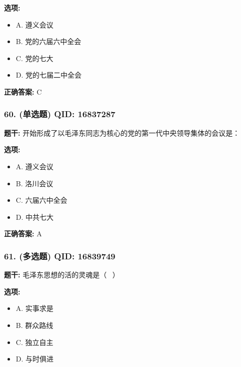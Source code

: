 \documentclass[12pt,UTF8]{ctexart}
\begin{document}
\textbf{选项:}
\begin{itemize}[leftmargin=*]

  \item A. 遵义会议

  \item B. 党的六届六中全会

  \item C. 党的七大

  \item D. 党的七届二中全会

\end{itemize}

\textbf{正确答案:}
C

\vspace{0.3em}\hrulefill\vspace{0.7em}

\subsubsection*{60. (单选题) \small QID: 16837287}

\textbf{题干:}
开始形成了以毛泽东同志为核心的党的第一代中央领导集体的会议是：

\textbf{选项:}
\begin{itemize}[leftmargin=*]

  \item A. 遵义会议

  \item B. 洛川会议

  \item C. 六届六中全会

  \item D. 中共七大

\end{itemize}

\textbf{正确答案:}
A

\vspace{0.3em}\hrulefill\vspace{0.7em}

\subsubsection*{61. (多选题) \small QID: 16839749}

\textbf{题干:}
毛泽东思想的活的灵魂是（  ）

\textbf{选项:}
\begin{itemize}[leftmargin=*]

  \item A. 实事求是

  \item B. 群众路线

  \item C. 独立自主

  \item D. 与时俱进

\end{itemize}
\end{document}
